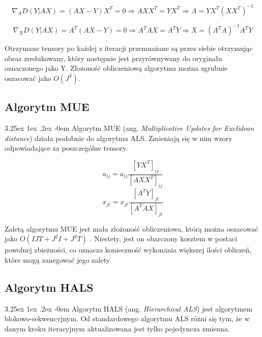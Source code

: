 \documentclass[11pt, a4paper]{article}
\makeatletter
\newcommand{\fbi}{\leavevmode{\parindent=1em\indent}}
\renewcommand\paragraph{\@startsection{paragraph}{5}{\z@}
  {3.25ex \@plus1ex \@minus.2ex}
  {-0em}
  {\normalfont\normalsize\bfseries}}
\makeatother
\begin{document}
\begin{equation}\label{eq:als1}
\nabla_A D(Y|AX) = (AX - Y)X^T = 0 \Rightarrow AXX^T = YX^T \Rightarrow A = YX^T(XX^T)^{-1}
\end{equation}

\begin{equation}\label{eq:als2}
\nabla_X D(Y|AX) = A^T(AX - Y) = 0 \Rightarrow A^TAX = A^TY \Rightarrow X = (A^TA)^{-1}A^TY
\end{equation}

\fbi
Otrzymane tensory po każdej z iteracji przemnażane są przez siebie otrzymując obraz zredukowany, który następnie jest przyrównywany do oryginału oznaczonego jako Y. Złożoność obliczeniową algorytmu można zgrubnie oszacować jako $ O(J^3) $.

\subsection{Algorytm MUE}
\paragraph{}
Algorytm MUE (ang. \textit{Multiplicative Updates for Euclidean distance}) działa podobnie do algorytmu ALS. Zmieniają się w nim wzory odpowiadające za poszczególne tensory.

\begin{equation}\label{eq:mue1}
a_{ij} = a_{ij}\frac{[YX^T]_{ij}}{[AXX^T]_{ij}}
\end{equation}
\begin{equation}\label{eq:mue2}
x_{jt} = x_{jt}\frac{[A^TY]_{jt}}{[A^TAX]_{jt}}
\end{equation}

\fbi
Zaletą algorytmu MUE jest mała złożoność obliczeniowa, którą można oszacować jako $ O(IJT + J^2I + J^2T) $ . Niestety, jest on obarczony kosztem w postaci powolnej zbieżności, co oznacza konieczność wykonania większej ilości obliczeń, które mogą zanegować jego zalety.

\subsection{Algorytm HALS}
\paragraph{}
Algorytm HALS (ang. \textit{Hierarchical ALS}) jest algorytmem blokowo-sekwencyjnym. Od standardowego algorytmu ALS różni się tym, że w danym kroku iteracyjnym aktualizowana jest tylko pojedyncza zmienna.
\end{document}
